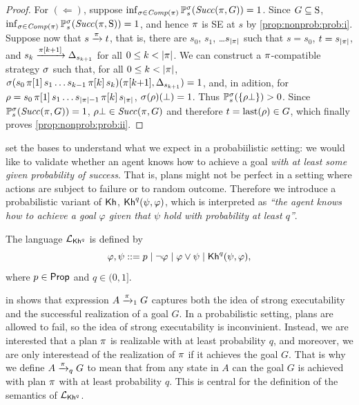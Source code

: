 \begin{proof}
  For $(\Leftarrow)$, suppose
  $\inf_{\strat\in\Comp(\plan)}\Prob^\strat_s(\Succ(\plan,G))=1$.
  Since $G\subseteq\S$,
  $\inf_{\strat\in\Comp(\plan)}\Prob^\strat_s(\Succ(\plan,\S))=1$, and
  hence $\plan$ is SE at $s$ by \cref{prop:nonprob:prob:i}.
  Suppose now that $s \reach{\plan} t$, that is, there are $s_0$,
  $s_1$, \ldots $s_{\size{\plan}}$ such that $s=s_0$, $t=s_{\size{\plan}}$, and
  $s_k\reach{\plan[k{+}1]}\Dirac_{s_{k{+}1}}$ for all $0\leq k < \size{\plan}$.
  We can construct a $\plan$-compatible strategy $\strat$
  such that, for all $0\leq k < \size{\plan}$,
  $\strat(s_0\,\plan[1]\,s_1\ldots s_{k{-}1}\,\plan[k]\,s_k)(\plan[k{+}1],\Dirac_{s_{k{+}1}})=1$,
  and, in adition, for
  $\rho = s_0\,\plan[1]\,s_1\ldots s_{\size{\plan}{-}1}\,\plan[k]\,s_{\size{\plan}}$,
  $\strat(\rho)(\complete)=1$.
  Thus $\Prob^\strat_s(\{\rho\bot\})>0$.  Since
  $\Prob^\strat_s(\Succ(\plan,G))=1$, $\rho\bot\in\Succ(\plan,G)$
  and therefore $t=\last(\rho)\in G$, which finally proves
  \cref{prop:nonprob:prob:ii}.
\end{proof}


 set the bases to understand what we expect in
a probabiilistic setting: we would like to validate whether an agent
knows how to achieve a goal \emph{with at least some given probability
of success}.  That is, plans might not be perfect in a setting where
actions are subject to failure or to random outcome.
%
Therefore we introduce a probabilistic variant of $\kh$,
$\kh^q(\psi,\varphi)$, which is interpreted as \emph{``the agent knows
how to achieve a goal $\varphi$ given that $\psi$ hold with
probability at least $q$''}.


\begin{definition}\label{def:syntax:PKh}
  The language $\PKh$ is defined by
  \[
  \varphi, \psi ::=
  p \mid \neg \varphi \mid \varphi \vee \psi \mid \kh^q(\psi,\varphi),
  \]
  where $p\in\Prop$ and $q\in(0,1]$.
\end{definition}


 in  shows that
expression $A\reach{\plan}_1 G$ captures both the idea of strong
executability and the successful realization of a goal $G$.  In a
probabilistic setting, plans are allowed to fail, so the idea of
strong executability is inconvinient.  Instead, we are interested that
a plan $\plan$ is realizable with at least probability $q$, and
moreover, we are only interestead of the realization of $\plan$ if it
achieves the goal $G$.  That is why we define $A\reach{\plan}_q G$ to
mean that from any state in $A$ can the goal $G$ is achieved with plan
$\plan$ with at least probability $q$.  This is central for the
definition of the semantics of $\PKh$.

